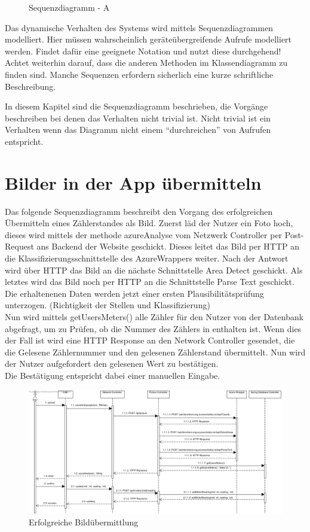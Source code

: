\begin{figure}[h]
	\centering
	\caption{Sequenzdiagramm - A}
	\label{fig:sequenz-a}
\end{figure}


\begin{tcolorbox}
Das dynamische Verhalten des Systems wird mittels Sequenzdiagrammen modelliert.
Hier müssen wahrscheinlich geräteübergreifende Aufrufe modelliert werden.
Findet dafür eine geeignete Notation und nutzt diese durchgehend! 
Achtet weiterhin darauf, dass die anderen Methoden im Klassendiagramm zu finden sind.
Manche Sequenzen erfordern sicherlich eine kurze schriftliche Beschreibung.
\end{tcolorbox}

In diesem Kapitel sind die Sequenzdiagramm beschrieben, die Vorgänge beschreiben bei denen das Verhalten nicht trivial ist.
Nicht trivial ist ein Verhalten wenn das Diagramm nicht einem ``durchreichen'' von Aufrufen entspricht.

\section{Bilder in der App übermitteln}
Das folgende Sequenzdiagramm beschreibt den Vorgang des erfolgreichen Übermitteln  eines Zählerstandes als Bild.
Zuerst läd der Nutzer ein Foto hoch, dieses wird mittels der methode azureAnalyse vom Netzwerk Controller per Post-Request ans Backend der Website geschickt. Dieses leitet das Bild per HTTP an die Klassifizierungsschnittstelle des AzureWrappers weiter. Nach der Antwort wird über HTTP das Bild an die nächste Schnittstelle Area Detect geschickt. Als letztes wird das Bild noch per HTTP an die Schnittstelle Parse Text geschickt. Die erhaltenenen Daten werden jetzt einer ersten Plausibilitätsprüfung unterzogen. (Richtigkeit der Stellen und Klassifizierung) \\
Nun wird mittels getUsersMeters() alle Zähler für den Nutzer von der Datenbank abgefragt, um zu Prüfen, ob die Nummer des Zählers in enthalten ist.
Wenn dies der Fall ist wird eine HTTP Response an den Network Controller gesendet, die die Gelesene Zählernummer und den gelesenen Zählerstand übermittelt. Nun wird der Nutzer aufgefordert den gelesenen Wert zu bestätigen. \\
Die Bestätigung entspricht dabei einer manuellen Eingabe.
\begin{figure}[H]
	\centering
	\caption{Erfolgreiche Bildübermittlung}
	\includegraphics[width=16cm]{img/diagrams/SubmitFotoSequence}
\end{figure}


